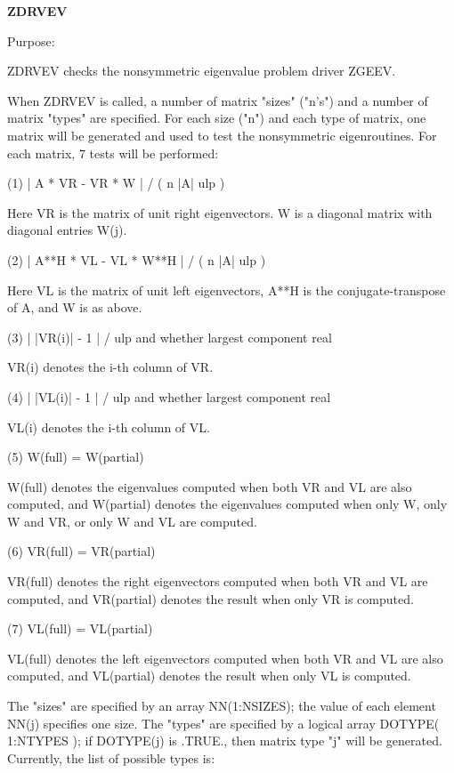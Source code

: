 {\bfseries Z\+D\+R\+V\+E\+V} 

\begin{DoxyParagraph}{Purpose\+: }
\begin{DoxyVerb}    ZDRVEV  checks the nonsymmetric eigenvalue problem driver ZGEEV.

    When ZDRVEV is called, a number of matrix "sizes" ("n's") and a
    number of matrix "types" are specified.  For each size ("n")
    and each type of matrix, one matrix will be generated and used
    to test the nonsymmetric eigenroutines.  For each matrix, 7
    tests will be performed:

    (1)     | A * VR - VR * W | / ( n |A| ulp )

      Here VR is the matrix of unit right eigenvectors.
      W is a diagonal matrix with diagonal entries W(j).

    (2)     | A**H * VL - VL * W**H | / ( n |A| ulp )

      Here VL is the matrix of unit left eigenvectors, A**H is the
      conjugate-transpose of A, and W is as above.

    (3)     | |VR(i)| - 1 | / ulp and whether largest component real

      VR(i) denotes the i-th column of VR.

    (4)     | |VL(i)| - 1 | / ulp and whether largest component real

      VL(i) denotes the i-th column of VL.

    (5)     W(full) = W(partial)

      W(full) denotes the eigenvalues computed when both VR and VL
      are also computed, and W(partial) denotes the eigenvalues
      computed when only W, only W and VR, or only W and VL are
      computed.

    (6)     VR(full) = VR(partial)

      VR(full) denotes the right eigenvectors computed when both VR
      and VL are computed, and VR(partial) denotes the result
      when only VR is computed.

     (7)     VL(full) = VL(partial)

      VL(full) denotes the left eigenvectors computed when both VR
      and VL are also computed, and VL(partial) denotes the result
      when only VL is computed.

    The "sizes" are specified by an array NN(1:NSIZES); the value of
    each element NN(j) specifies one size.
    The "types" are specified by a logical array DOTYPE( 1:NTYPES );
    if DOTYPE(j) is .TRUE., then matrix type "j" will be generated.
    Currently, the list of possible types is:


\end{DoxyVerb}
\end{DoxyParagraph}
